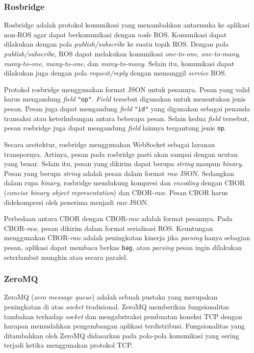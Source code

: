\subsubsection{Rosbridge}

Rosbridge adalah protokol komunikasi yang menambahkan antarmuka ke aplika\-si
non-ROS agar dapat berkomunikasi dengan \textit{node} ROS. Komunikasi dapat
dilakukan dengan pola \textit{publish/subscribe} ke suatu topik ROS. Dengan pola
\textit{publish/subscribe}, ROS dapat melakukan komunikasi \textit{one-to-one},
\textit{one-to-many}, \textit{many-to-one}, \textit{many-to-one}, dan
\textit{many-to-many}. Selain itu, komunikasi dapat dilakukan juga dengan pola
\textit{request/reply} dengan memanggil \textit{service} ROS.

Protokol rosbridge menggunakan format JSON untuk pesannya. Pesan yang valid
harus mengandung \textit{field} \texttt{"op"}. \textit{Field} tersebut digunakan
untuk menentukan jenis pesan. Pesan juga dapat mengandung \textit{field}
\texttt{"id"} yang digunakan sebagai penanda transaksi atau keterhubungan antara
beberapa pesan. Selain kedua \textit{field} tersebut, pesan rosbridge juga dapat
mengandung \textit{field} lainnya tergantung jenis \texttt{op}.

Secara arsitektur, rosbridge menggunakan WebSocket sebagai layanan
trans\-por\-nya. Artinya, pesan pada rosbridge pasti akan sampai dengan urutan
yang benar. Selain itu, pesan yang dikirim dapat berupa \textit{string} maupun
\textit{binary}. Pesan yang berupa \textit{string} adalah pesan dalam format
\textit{raw} JSON. Sedangkan dalam rupa \textit{binary}, rosbridge mendukung
kompresi dan \textit{encoding} dengan CBOR (\textit{concise binary object
    representation}) dan CBOR-\textit{raw}. Pesan CBOR harus didekompresi oleh
penerima menjadi \textit{raw} JSON.

Perbedaan antara CBOR dengan CBOR-\textit{raw} adalah format pesannya. Pada
CBOR-\textit{raw}, pesan dikirim dalam format serialisasi ROS. Keuntungan
menggunakan C\-B\-O\-R-\textit{raw} adalah peningkatan kinerja jika \textit{parsing}
hanya sebagian pesan, aplikasi dapat membaca berkas \texttt{bag}, atau
\textit{parsing} pesan ingin dilakukan seterlambat mungkin atau secara paralel.

\subsubsection{ZeroMQ}

ZeroMQ (\textit{zero message queue}) adalah sebuah pustaka yang merupakan
pe\-ning\-ka\-tan di atas \textit{socket} tradisional. ZeroMQ memberikan
fungsionalitas tambahan terhadap \textit{socket} dan mengabstraksi pembuatan
koneksi TCP dengan harapan memudahkan pengembangan aplikasi terdistribusi.
Fungsionalitas yang ditambahkan oleh ZeroMQ didasarkan pada pola-pola komunikasi
yang sering terjadi ketika menggunakan protokol TCP.


